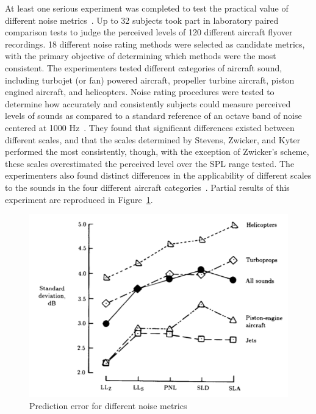 \documentclass[]{aiaa-tc}%
\begin{document}
At least one serious experiment was completed to test the practical value of different noise metrics~\cite{ollerhead1971evaluation}. Up to 32 subjects took part in laboratory paired comparison tests to judge the perceived levels of 120 different aircraft flyover recordings. 18 different noise rating methods were selected as candidate metrics, with the primary objective of determining which methods were the most consistent. The experimenters tested different categories of aircraft sound, including turbojet (or fan) powered aircraft, propeller turbine aircraft, piston engined aircraft, and helicopters. Noise rating procedures were tested to determine how accurately and consistently subjects could measure perceived levels of sounds as compared to a standard reference of an octave band of noise centered at 1000 Hz~\cite{ollerhead1971evaluation}. They found that significant differences existed between different scales, and that the scales determined by Stevens, Zwicker, and Kyter performed the most consistently, though, with the exception of Zwicker's scheme, these scales overestimated the perceived level over the SPL range tested. The experimenters also found distinct differences in the applicability of different scales to the sounds in the four different aircraft categories~\cite{ollerhead1971evaluation}. Partial results of this experiment are reproduced in Figure~\ref{fig:noise-metrics}.

\begin{figure}[tb!]
  \centering
  \includegraphics[width=\textwidth]{figs/noise-metrics.png}
  \caption{Prediction error for different noise metrics~\cite{ollerhead1971evaluation}}
  \label{fig:noise-metrics}
\end{figure}


\nocite{*}

\end{document}
